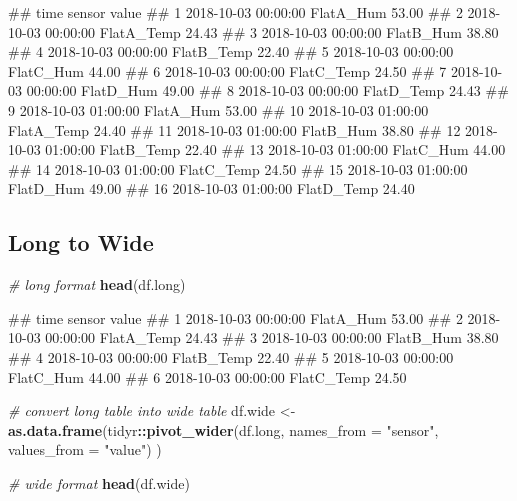 \documentclass[
]{book}
\newenvironment{Shaded}{\begin{snugshade}}{\end{snugshade}}
\newcommand{\CommentTok}[1]{\textcolor[rgb]{0.56,0.35,0.01}{\textit{#1}}}
\newcommand{\DataTypeTok}[1]{\textcolor[rgb]{0.13,0.29,0.53}{#1}}
\newcommand{\KeywordTok}[1]{\textcolor[rgb]{0.13,0.29,0.53}{\textbf{#1}}}
\newcommand{\NormalTok}[1]{#1}
\newcommand{\OperatorTok}[1]{\textcolor[rgb]{0.81,0.36,0.00}{\textbf{#1}}}
\newcommand{\StringTok}[1]{\textcolor[rgb]{0.31,0.60,0.02}{#1}}
\let\oldShaded\Shaded
\let\endoldShaded\endShaded
\renewenvironment{Shaded}{\footnotesize\oldShaded}{\endoldShaded}
\let\oldverbatim\verbatim
\let\endoldverbatim\endverbatim
\renewenvironment{verbatim}{\footnotesize\oldverbatim}{\endoldverbatim}
\begin{document}
\begin{verbatim}
##                   time     sensor value
## 1  2018-10-03 00:00:00  FlatA_Hum 53.00
## 2  2018-10-03 00:00:00 FlatA_Temp 24.43
## 3  2018-10-03 00:00:00  FlatB_Hum 38.80
## 4  2018-10-03 00:00:00 FlatB_Temp 22.40
## 5  2018-10-03 00:00:00  FlatC_Hum 44.00
## 6  2018-10-03 00:00:00 FlatC_Temp 24.50
## 7  2018-10-03 00:00:00  FlatD_Hum 49.00
## 8  2018-10-03 00:00:00 FlatD_Temp 24.43
## 9  2018-10-03 01:00:00  FlatA_Hum 53.00
## 10 2018-10-03 01:00:00 FlatA_Temp 24.40
## 11 2018-10-03 01:00:00  FlatB_Hum 38.80
## 12 2018-10-03 01:00:00 FlatB_Temp 22.40
## 13 2018-10-03 01:00:00  FlatC_Hum 44.00
## 14 2018-10-03 01:00:00 FlatC_Temp 24.50
## 15 2018-10-03 01:00:00  FlatD_Hum 49.00
## 16 2018-10-03 01:00:00 FlatD_Temp 24.40
\end{verbatim}

\hypertarget{long-to-wide}{%
\subsection{Long to Wide}\label{long-to-wide}}

\begin{Shaded}
\begin{Highlighting}[]
\CommentTok{# long format}
\KeywordTok{head}\NormalTok{(df.long)}
\end{Highlighting}
\end{Shaded}

\begin{verbatim}
##                  time     sensor value
## 1 2018-10-03 00:00:00  FlatA_Hum 53.00
## 2 2018-10-03 00:00:00 FlatA_Temp 24.43
## 3 2018-10-03 00:00:00  FlatB_Hum 38.80
## 4 2018-10-03 00:00:00 FlatB_Temp 22.40
## 5 2018-10-03 00:00:00  FlatC_Hum 44.00
## 6 2018-10-03 00:00:00 FlatC_Temp 24.50
\end{verbatim}

\begin{Shaded}
\begin{Highlighting}[]
\CommentTok{# convert long table into wide table}
\NormalTok{df.wide <-}\StringTok{ }\KeywordTok{as.data.frame}\NormalTok{(tidyr}\OperatorTok{::}\KeywordTok{pivot_wider}\NormalTok{(df.long,}
                                            \DataTypeTok{names_from =} \StringTok{"sensor"}\NormalTok{,}
                                            \DataTypeTok{values_from =} \StringTok{"value"}\NormalTok{)}
\NormalTok{                         )}

\CommentTok{# wide format}
\KeywordTok{head}\NormalTok{(df.wide)}
\end{Highlighting}
\end{Shaded}
\end{document}
